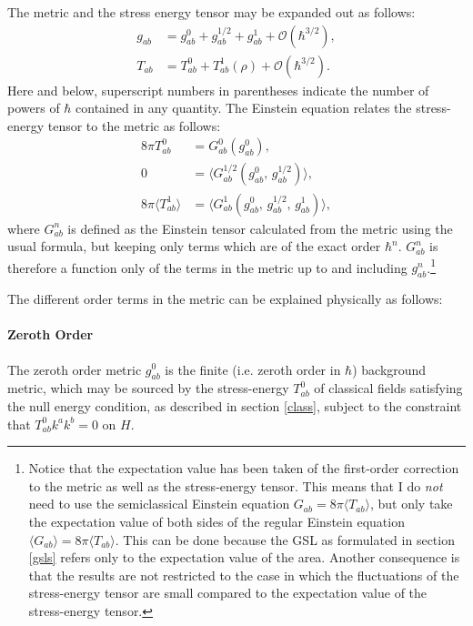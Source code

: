 \documentclass[11pt]{article}
\begin{document}
The metric and the stress energy tensor may be expanded out as follows: 
\begin{align}\label{g}
g_{ab} &= g_{ab}^{0} + g_{ab}^{1/2} + g_{ab}^{1} + \mathcal{O}(\hbar^{3/2}), \\ \label{T}
T_{ab} &= T_{ab}^{0} + T_{ab}^{1}(\rho) + \mathcal{O}(\hbar^{3/2}).
\end{align}
Here and below, superscript numbers in parentheses indicate the number of powers of $\hbar$ contained in any quantity.  The Einstein equation relates the stress-energy tensor to the metric as follows:
\begin{align}\label{Ein0}
8\pi T_{ab}^{0}& = G_{ab}^{0}(g_{ab}^{0}), 
\\ \label{Ein1/2}
0& = \langle G_{ab}^{1/2} (g_{ab}^{0},\,g_{ab}^{1/2}) \rangle,
\\ \label{Ein1}
8\pi \langle T_{ab}^{1} \rangle & = \langle G_{ab}^{1} 
(g_{ab}^{0},\,g_{ab}^{1/2},\,g_{ab}^{1}) \rangle,
\end{align}
where $G_{ab}^{n}$ is defined as the Einstein tensor calculated from the metric using the usual formula, but keeping only terms which are of the exact order $\hbar^{n}$.  $G_{ab}^{n}$ is therefore a function only of the terms in the metric up to and including $g_{ab}^{n}$.\footnote{Notice that the expectation value has been taken of the first-order correction to the metric as well as the stress-energy tensor.  This means that I do \emph{not} need to use the semiclassical Einstein equation $G_{ab} = 8\pi \langle T_{ab} \rangle$, but only take the expectation value of both sides of the regular Einstein equation $\langle G_{ab} \rangle = 8\pi \langle T_{ab} \rangle$.  This can be done because the GSL as formulated in section \ref{gsls} refers only to the expectation value of the area.  Another consequence is that the results are not restricted to the case in which the fluctuations of the stress-energy tensor are small compared to the expectation value of the stress-energy tensor.}

The different order terms in the metric can be explained physically as follows:
\paragraph{Zeroth Order}
The zeroth order metric $g_{ab}^{0}$ is the finite (i.e. zeroth order in $\hbar$) background metric, which may be sourced by the stress-energy $T_{ab}^{0}$ of classical fields satisfying the null energy condition, as described in section \ref{class}, subject to the constraint that $T_{ab}^{0} k^a k^b = 0$ on $H$.
\end{document}
